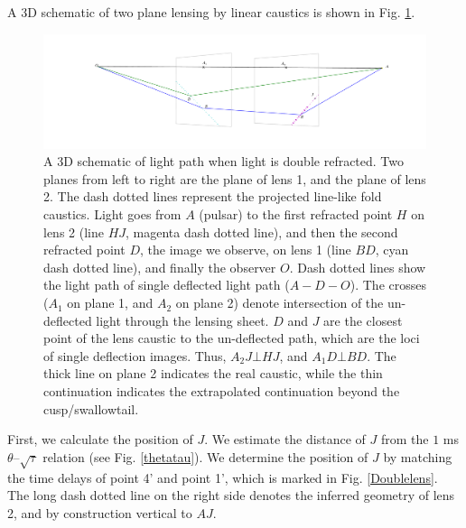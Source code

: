 \documentclass[useAMS,usenatbib]{mn2e}
\begin{document}
A 3D schematic of two plane lensing by linear caustics is shown in
Fig. \ref{fig:3D_image}. 
\begin{figure}
\hspace*{-1in}\includegraphics[width=9in]{3D_image.pdf}
\caption{A 3D schematic of light path when light is double
  refracted. Two planes from left to right are the plane of lens 1,
  and the plane of lens 2.  The dash dotted lines represent the
  projected line-like fold caustics. 
Light goes from $A$ (pulsar) to the first
  refracted point $H$ on lens 2 (line $HJ$, magenta dash dotted line), and
  then the second refracted point $D$, the image we observe, on lens 1
  (line $BD$, cyan dash dotted line), and finally the observer $O$. Dash
  dotted lines show the light path of single deflected light path
  ($A-D-O$). The crosses ($A_1$ on plane 1, and $A_2$ on 
  plane 2) denote intersection of the un-deflected light through the
  lensing sheet. $D$ and $J$ are the closest point of the lens caustic
  to the un-deflected path, which are the loci of single deflection
  images. Thus, $A_2J\bot
  HJ$, and $A_1D\bot BD$.  The thick line on plane 2 indicates the
  real caustic, while the thin continuation indicates the extrapolated
  continuation beyond the cusp/swallowtail.
}
\label{fig:3D_image}
\end{figure}



First, we calculate the position of $J$. We  estimate the
distance of $J$ from the $1$ ms $\theta$--$\sqrt{\tau}$ relation (see
Fig. \ref{thetatau}). We determine the position of $J$ by
matching the time delays of point 4' and point 1', which is
marked in Fig. \ref{Doublelens}. The long dash dotted line on the right side
denotes the inferred geometry of lens 2, and by construction vertical
to $AJ$. 
\end{document}
